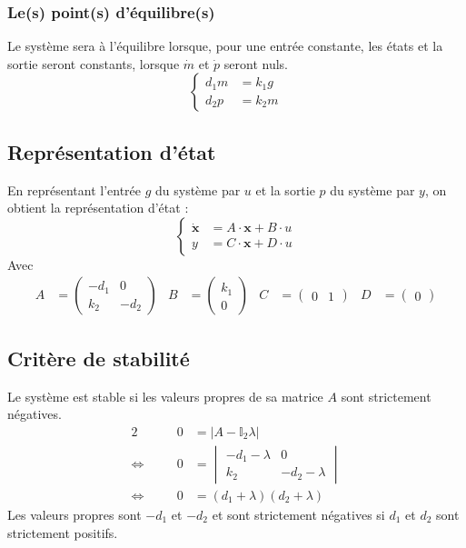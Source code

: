 \documentclass[a4paper, 12pt]{article}
\begin{document}
	\subsubsection{Le(s) point(s) d'équilibre(s)}
	Le système sera à l'équilibre lorsque, pour une entrée constante, les états et la sortie seront constants, \cad lorsque $\dot{m}$ et $\dot{p}$ seront nuls.
	\begin{equation}
		\left\{
		\begin{aligned}
			{d}_{1}m & = {k}_{1}g \\
			{d}_{2}p & = {k}_{2}m
		\end{aligned}
		\right.
	\end{equation}
	\subsection{Représentation d'état}
	En représentant l'entrée $g$ du système par $u$ et la sortie $p$ du système par $y$, on obtient la représentation d'état :
	\begin{equation}
		\left\{
		\begin{aligned}
			\dot{\bm x} & = A \cdot {\bm x} + B \cdot u \\
			y           & = C \cdot {\bm x} + D \cdot u
		\end{aligned}
		\right.
	\end{equation}
	Avec
	\begin{align}
		A & = 
		\begin{pmatrix}
			-{d}_{1} & 0        \\
			{k}_{2}  & -{d}_{2}
		\end{pmatrix} &
		B & = 
		\begin{pmatrix}
			{k}_{1} \\
			0
		\end{pmatrix} &
		C & =
		\begin{pmatrix}
			0 & 1
		\end{pmatrix} &
		D & =
		\begin{pmatrix}
			0
		\end{pmatrix}
	\end{align}
	\subsection{Critère de stabilité}
	Le système est stable si les valeurs propres de sa matrice $A$ sont strictement négatives.
	\begin{alignat*}{2}
		                      &  & 0 & = \left|A-\mathbb{I}_2\lambda\right|                       \\
		\Leftrightarrow \quad &  & 0 & = 
		\begin{vmatrix}
		-{d}_{1}-\lambda & 0                \\
		{k}_{2}          & -{d}_{2}-\lambda
		\end{vmatrix} \\
		\Leftrightarrow \quad &  & 0 & = \left({d}_{1}+\lambda\right)\left({d}_{2}+\lambda\right)
	\end{alignat*}
	Les valeurs propres sont $-{d}_{1}$ et $-{d}_{2}$ et sont strictement négatives si ${d}_{1}$ et ${d}_{2}$ sont strictement positifs.
\end{document}
